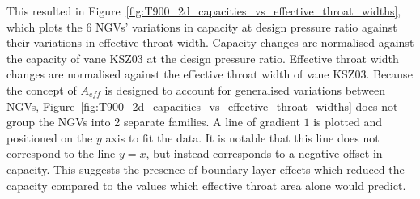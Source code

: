 \documentclass[a4paper, 11pt, oneside]{report}
\begin{document}
This resulted in Figure~\ref{fig:T900_2d_capacities_vs_effective_throat_widths}, which plots the 6 NGVs' variations in capacity at design pressure ratio against their variations in effective throat width. Capacity changes are normalised against the capacity of vane KSZ03 at the design pressure ratio. Effective throat width changes are normalised against the effective throat width of vane KSZ03. Because the concept of $A_{eff}$ is designed to account for generalised variations between NGVs, Figure~\ref{fig:T900_2d_capacities_vs_effective_throat_widths} does not group the NGVs into 2 separate families. A line of gradient $1$ is plotted and positioned on the $y$ axis to fit the data. It is notable that this line does not correspond to the line $y=x$, but instead corresponds to a negative offset in capacity. This suggests the presence of boundary layer effects which reduced the capacity compared to the values which effective throat area alone would predict.
\end{document}
